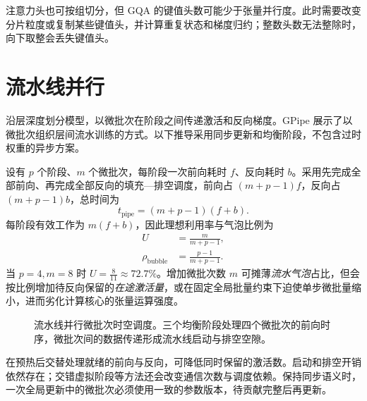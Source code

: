 \documentclass[../textbook.tex]{subfiles}
\begin{document}
注意力头也可按组切分，但 GQA 的键值头数可能少于张量并行度。此时需要改变分片粒度或复制某些键值头，并计算重复状态和梯度归约；整数头数无法整除时，向下取整会丢失键值头。

\section{流水线并行}

沿层深度划分模型，以微批次在阶段之间传递激活和反向梯度。GPipe 展示了以微批次组织层间流水训练的方式\autocite{huang2019gpipe}。以下推导采用同步更新和均衡阶段，不包含过时权重的异步方案。

设有 $p$ 个阶段、$m$ 个微批次，每阶段一次前向耗时 $f$、反向耗时 $b$。采用先完成全部前向、再完成全部反向的填充—排空调度，前向占 $(m+p-1)f$，反向占 $(m+p-1)b$，总时间为
\begin{equation}
 t_{\mathrm{pipe}}=(m+p-1)(f+b).
\end{equation}
每阶段有效工作为 $m(f+b)$，因此理想利用率与气泡比例为
\begin{equation}\label{eq:dist-pipeline-bubble}
 \begin{aligned}
  U &= \frac{m}{m+p-1}, \\
  \rho_{\mathrm{bubble}} &= \frac{p-1}{m+p-1}.
 \end{aligned}
\end{equation}
当 $p=4,m=8$ 时 $U=\frac{8}{11}\approx 72.7\%$。增加微批次数 $m$ 可摊薄\emph{流水气泡}占比，但会按比例增加待反向保留的\emph{在途激活量}，或在固定全局批量约束下迫使单步微批量缩小，进而劣化计算核心的张量运算强度。

\begin{figure}[htbp]
\centering
{}
\caption[流水线并行微批次时空调度]{流水线并行微批次时空调度。三个均衡阶段处理四个微批次的前向时序，微批次间的数据传递形成流水线启动与排空空隙。}\label{fig:dist-pipeline}
\end{figure}

在预热后交替处理就绪的前向与反向，可降低同时保留的激活数。启动和排空开销依然存在；交错虚拟阶段等方法还会改变通信次数与调度依赖。保持同步语义时，一次全局更新中的微批次必须使用一致的参数版本，待贡献完整后再更新。
\end{document}
